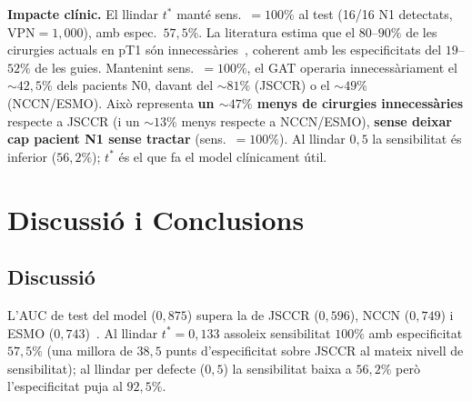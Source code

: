 \documentclass[10pt,a4paper,twocolumn,twoside]{article}
\begin{document}
\textbf{Impacte clínic.} El llindar $t^*$ manté sens.\ $=100\%$ al test (16/16 N1
detectats, $\text{VPN}\!=\!1{,}000$), amb espec.\ $57{,}5\%$. La literatura estima que el
$80$–$90\%$ de les cirurgies actuals en pT1 són innecessàries~\cite{MartinezDeJuan2024},
coherent amb les especificitats del $19$–$52\%$ de les guies. Mantenint sens.\ $=100\%$, el
GAT operaria innecessàriament el $\sim\!42{,}5\%$ dels pacients N0, davant del $\sim\!81\%$
(JSCCR) o el $\sim\!49\%$ (NCCN/ESMO). Això representa \textbf{un $\sim\!47\%$ menys de
cirurgies innecessàries} respecte a JSCCR (i un $\sim\!13\%$ menys respecte a NCCN/ESMO),
\textbf{sense deixar cap pacient N1 sense tractar} (sens.\ $=100\%$). Al llindar $0{,}5$ la
sensibilitat és inferior ($56{,}2\%$); $t^*$ és el que fa el model clínicament útil.

%

\section{Discussió i Conclusions}

\subsection{Discussió}

L'AUC de test del model ($0{,}875$) supera la de JSCCR ($0{,}596$), NCCN ($0{,}749$) i
ESMO ($0{,}743$)~\cite{tanino2024comparative}. Al llindar $t^*\!=\!0{,}133$ assoleix
sensibilitat $100\%$ amb especificitat $57{,}5\%$ (una millora de $38{,}5$ punts
d'especificitat sobre JSCCR al mateix nivell de sensibilitat); al llindar per defecte
($0{,}5$) la sensibilitat baixa a $56{,}2\%$ però l'especificitat puja al $92{,}5\%$.
\end{document}
